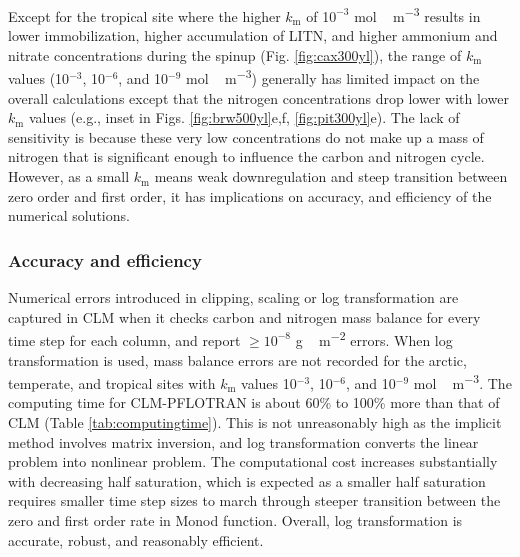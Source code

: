 \documentclass[gmd, manuscript]{copernicus}
\begin{document}
Except for the tropical site where the higher $k_\text{m}$ of 1$0^{-3}$
\unit{mol\,m^{-3}} results in lower immobilization, higher accumulation of
LITN, and  higher ammonium and nitrate concentrations during the spinup (Fig.
\ref{fig:cax300yl}), the range of $k_\text{m}$ values (10$^{-3}$, 10$^{-6}$,
and 10$^{-9}$ \unit{mol\,m^{-3}}) generally has limited impact on the overall
calculations except that the nitrogen concentrations drop lower with lower
$k_\text{m}$ values (e.g., inset in Figs. \ref{fig:brw500yl}e,f,
\ref{fig:pit300yl}e). The lack of
sensitivity is because these very low concentrations do not make up a mass of
nitrogen that is significant enough to influence the carbon and nitrogen cycle.
However, as a small $k_\text{m}$ means weak downregulation and steep transition
between zero order and first order, it has implications on accuracy,
and efficiency of the numerical solutions.

\subsubsection{Accuracy and efficiency}
Numerical errors introduced in clipping, scaling or log transformation are captured in CLM when it checks carbon and nitrogen mass
balance for every time step for each column, and report  $\geq 10^{-8}$ \unit{g\,m^{-2}} errors.  When log transformation is used, 
mass balance errors are not recorded for the arctic, temperate, and tropical sites with $k_\text{m}$ values 
10$^{-3}$, 10$^{-6}$, and 10$^{-9}$ \unit{mol\,m^{-3}}. The computing time for
CLM-PFLOTRAN is about 60\% to 100\% more than that of CLM (Table
\ref{tab:computingtime}). This is not unreasonably high as the implicit
method involves matrix inversion, and log transformation converts the linear
problem into nonlinear problem. The computational cost increases substantially with
decreasing half saturation, which is expected as a smaller half saturation
requires smaller time step sizes to march through steeper transition between
the zero and first order rate in Monod function. Overall, log transformation is
accurate, robust, and reasonably efficient.  
\end{document}
